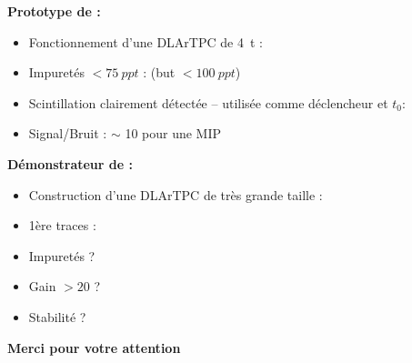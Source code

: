     {
        \begin{specialframe}
            \hspace*{-1.8cm}\parbox[t]{\textwidth}{
                        \centering \begin{Huge}
                        \vspace{3cm}
                        \end{Huge}
                        \textbf{Prototype de \TOO{} :}
                        \begin{itemize}
              	           	\item Fonctionnement d'une DLArTPC de \SI{4}{\tonne} : \textcolor{green}{\checkmark}
        	               	\item Impuretés $<\SI{75}{ppt}$ : \textcolor{green}{\checkmark} (but $<\SI{100}{ppt}$)
        	               	\item Scintillation clairement détectée --  utilisée comme déclencheur et $t_0$: \textcolor{green}{\checkmark}
          	               	\item Signal/Bruit : $\sim$ 10 pour une MIP
          	           	\end{itemize}
                        \vspace{0.3cm}
                        \textbf{ Démonstrateur de \SSS{} : }
                        \begin{itemize}
                            \item Construction d'une DLArTPC de très grande taille : \textcolor{green}{\checkmark}
                            \item 1ère traces : \textcolor{green}{\checkmark}
                            \item Impuretés ?
                            \item Gain $> 20$ ?
                            \item Stabilité ?
                        \end{itemize}
                    }
        \end{specialframe}
    }
    {
        \begin{specialframe}
            \hspace*{-1.8cm}\parbox[t]{\textwidth}{
                        \centering \begin{Huge}
                        \vspace{1cm}
                        \textbf{Merci pour votre attention}
                        \end{Huge}
                    }
        \end{specialframe}
    }
    
